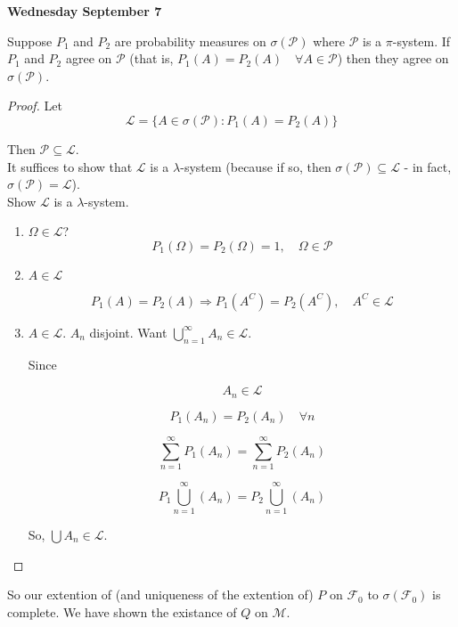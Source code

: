 \documentclass[11pt,fleqn]{book} %
\begin{document}
\textbf{Wednesday September 7}

\begin{theorem}
	Suppose $P_1$ and $P_2$ are probability measures on $\sigma(\mathcal{P})$ where $\mathcal{P}$ is a $\pi$-system. If $P_1$ and $P_2$ agree on $\mathcal{P}$ (that is, $P_1(A) = P_2(A) \quad \forall A \in \mathcal{P}$) then they agree on $\sigma(\mathcal{P})$.
\end{theorem}

\begin{proof}
	Let $$\mathcal{L} = \{A \in \sigma(\mathcal{P}): P_1(A) = P_2 (A) \}$$

	Then $\mathcal{P} \subseteq \mathcal{L}$.\\

	It suffices to show that $\mathcal{L}$ is a $\lambda$-system (because if so, then $\sigma(\mathcal{P}) \subseteq \mathcal{L}$ - in fact, $\sigma(\mathcal{P}) = \mathcal{L}$). \\

	Show $\mathcal{L}$ is a $\lambda$-system.\\

	\begin{enumerate}
		\item $\Omega \in \mathcal{L}$?
			$$P_1(\Omega) = P_2(\Omega) = 1, \quad \Omega \in \mathcal{P}$$

		\item $A \in \mathcal{L}$

		$$ P_1(A) = P_2(A) \Rightarrow P_1(A^C) = P_2(A^C), \quad A^C \in \mathcal{L}$$

		\item $A \in \mathcal{L}$. $A_n$ disjoint. Want $\bigcup^\infty_{n=1} A_n \in \mathcal{L}$.

		Since

		$$A_n \in \mathcal{L} $$

		$$P_1(A_n) = P_2(A_n) \quad \forall n$$

		$$\displaystyle \sum^\infty_{n=1} P_1(A_n) = \displaystyle \sum^\infty_{n=1} P_2(A_n) $$

		$$P_1 \displaystyle \bigcup^\infty_{n=1} (A_n) = P_2 \displaystyle \bigcup^\infty_{n=1} (A_n) $$

		So, $\bigcup A_n \in \mathcal{L}$.


	\end{enumerate}
\end{proof}

So our extention of (and uniqueness of the extention of) $P$ on $\mathcal{F}_0$ to $\sigma(\mathcal{F}_0)$ is complete. We have shown the existance of $Q$ on $\mathcal{M}$. \\
\end{document}
